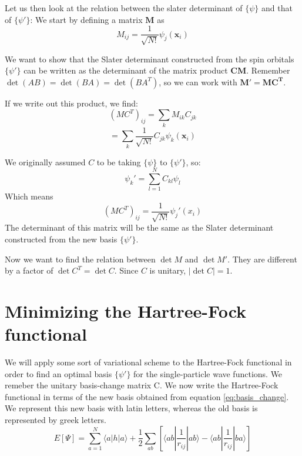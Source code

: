 \documentclass[a4paper,10pt, twocolumn]{article}
\newcommand{\xvec}{\mathbf{x}}
\newcommand{\mb}{\mathbf}
\begin{document}
Let us then look at the relation between the slater determinant of $\{ \psi\}$ and that of $\{\psi'\}$:
We start by defining a matrix $\mb{M}$ as
\begin{equation}
	M_{ij} =\frac{1}{\sqrt{N!}} \psi_j(\xvec_i)
\end{equation}

We want to show that the Slater determinant constructed from the spin orbitals $\{\psi'\}$ can be written as the determinant of the matrix product $\mb{C}\mb{M}$. Remember $\det(AB) = \det(BA) = \det(BA^T)$, so we can work with $\mb{M}'=\mb{M}\mb{C^T}$.

If we write out this product, we find:
\begin{equation}
	(MC^T)_{ij} = \sum_{k} M_{ik} C_{jk}
\end{equation}
\begin{equation}
	= \sum_{k}\frac{1}{\sqrt{N!}}C_{jk}\psi_k(\xvec_i)
\end{equation}

We originally assumed $C$ to be taking $\{ \psi\}$ to $\{\psi'\}$, so:
\begin{equation}
	\psi_k' = \sum_{l=1}^N C_{kl} \psi_l
	\label{eq:basis_change}
\end{equation}
Which means
\begin{equation}
(MC^T)_{ij} = \frac{1}{\sqrt{N!}} \psi_j'(x_i)
\end{equation}
The determinant of this matrix will be the same as the Slater determinant constructed from the new basis $\{\psi'\}$.

Now we want to find the relation between $\det{M}$ and $\det{M'}$. They are different by a factor of $\det{C^T} = \det{C}$. Since $C$ is unitary, $|\det C| = 1$.

\section{Minimizing the Hartree-Fock functional}
We will apply some sort of variational scheme to the Hartree-Fock functional in order to find an optimal basis $\{\psi'\}$ for the single-particle wave functions. We remeber the unitary basis-change matrix C. 
We now write the Hartree-Fock functional in terms of the new basis obtained from equation \ref{eq:basis_change}. We represent this new basis with latin letters, whereas the old basis is represented by greek letters. 
\begin{equation}
	E[\Psi] = \sum_{a=1}^N \langle a|h|a \rangle + \frac{1}{2} \sum_{ab}\left[  \langle ab |\frac{1}{r_{ij}}|ab \rangle - \langle ab | \frac{1}{r_{ij} }| ba\rangle \right]
\end{equation}
\end{document}
